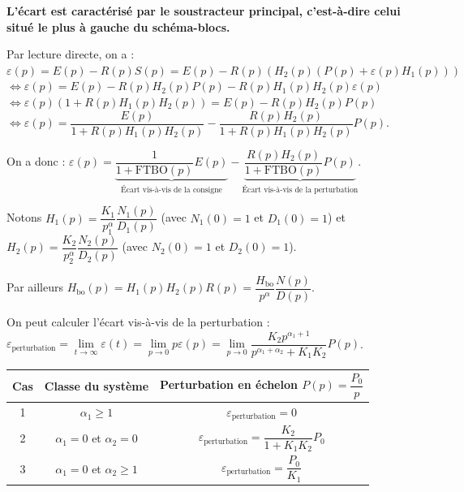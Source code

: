 \documentclass[10pt,fleqn]{article} %
\begin{document}
\vspace{.25cm}

\textbf{L'écart est caractérisé par le soustracteur principal, c'est-à-dire celui situé le plus à gauche du schéma-blocs.}

\vspace{.25cm}

Par lecture directe, on a : 
$\varepsilon(p)
=E(p)-R(p)S(p)
=E(p)-R(p)\left(H_2(p) \left(P(p)+\varepsilon(p)H_1(p) \right)\right)$
$\Longleftrightarrow 
\varepsilon(p) =E(p)- R(p)H_2(p)P(p)-R(p)H_1(p)H_2(p)\varepsilon(p) $
$\Longleftrightarrow \varepsilon(p)\left( 1+R(p)H_1(p)H_2(p)\right) =E(p)- R(p)H_2(p)P(p)$
$\Longleftrightarrow \varepsilon(p) =\dfrac{E(p)}{1+R(p)H_1(p)H_2(p)}- \dfrac{R(p)H_2(p)}{1+R(p)H_1(p)H_2(p)}P(p)$.

On a donc :
$\varepsilon(p) =\underbrace{\dfrac{1}{1+\text{FTBO}(p)} E(p)}_{\text{\'Ecart vis-à-vis de la consigne}} - \underbrace{\dfrac{R(p)H_2(p)}{1+\text{FTBO}(p)}P(p)}_{\text{\'Ecart vis-à-vis de la perturbation}}$.

Notons $H_1(p)=\dfrac{K_1}{p^\alpha_1}\dfrac{N_1(p)}{D_1(p)}$ (avec $N_1(0)=1$ et $D_1(0)=1$) et $H_2(p)=\dfrac{K_2}{p^\alpha_2}\dfrac{N_2(p)}{D_2(p)}$ (avec $N_2(0)=1$ et $D_2(0)=1$).

Par ailleurs 
$H_{\text{bo}}(p)=H_1(p)H_2(p)R(p)
=\dfrac{H_{\text{bo}}}{p^{\alpha}}\dfrac{N(p)}{D(p)}$.

On peut calculer l'écart vis-à-vis de la perturbation : 
$\varepsilon_{\text{perturbation}}
= \lim\limits_{t\to\infty}\varepsilon(t)
= \lim\limits_{p\to 0}p \varepsilon(p) 
= \lim\limits_{p\to 0} \dfrac{K_2 p^{\alpha_1+1}}{p^{\alpha_1+\alpha_2}+K_1K_2}P(p) $.


\begin{center}
\begin{tabular}{|c|c|c|}
\hline
Cas & Classe du système & Perturbation en échelon $P(p)=\dfrac{P_0}{p}$ \\ \hline
1 & $\alpha_1\geq 1$ & $\varepsilon_{\text{perturbation}}=0$ \\ \hline
2 & $\alpha_1=0$ et $\alpha_2=0$ & $\varepsilon_{\text{perturbation}}=\dfrac{K_2}{1+K_1K_2}P_0$ \\ \hline
3 & $\alpha_1=0$ et $\alpha_2\geq 1$ & $\varepsilon_{\text{perturbation}}=\dfrac{P_0}{K_1}$ \\ \hline
\end{tabular}
\end{center}
\end{document}
